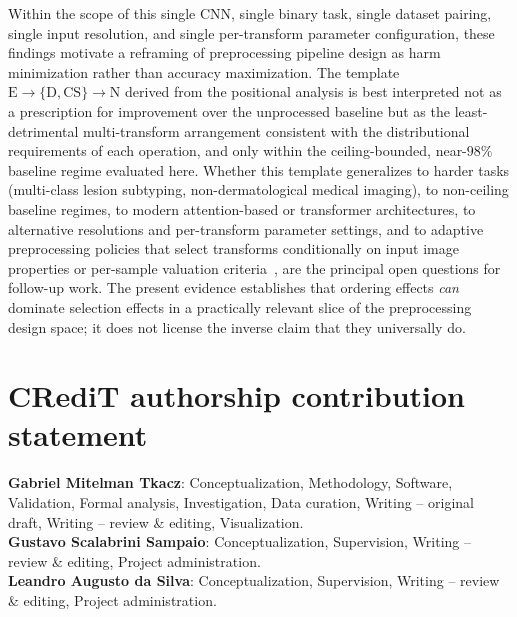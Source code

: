 \documentclass[preprint,5p,times,twocolumn]{elsarticle}
\begin{document}
Within the scope of this single CNN, single binary task, single dataset pairing, single input resolution, and single per-transform parameter configuration, these findings motivate a reframing of preprocessing pipeline design as harm minimization rather than accuracy maximization. The template $\text{E} \to \{\text{D}, \text{CS}\} \to \text{N}$ derived from the positional analysis is best interpreted not as a prescription for improvement over the unprocessed baseline but as the least-detrimental multi-transform arrangement consistent with the distributional requirements of each operation, and only within the ceiling-bounded, near-$98\%$ baseline regime evaluated here. Whether this template generalizes to harder tasks (multi-class lesion subtyping, non-dermatological medical imaging), to non-ceiling baseline regimes, to modern attention-based or transformer architectures, to alternative resolutions and per-transform parameter settings, and to adaptive preprocessing policies that select transforms conditionally on input image properties or per-sample valuation criteria~\cite{Yoon2020}, are the principal open questions for follow-up work. The present evidence establishes that ordering effects \emph{can} dominate selection effects in a practically relevant slice of the preprocessing design space; it does not license the inverse claim that they universally do.




\section*{CRediT authorship contribution statement}
\textbf{Gabriel Mitelman Tkacz}: Conceptualization, Methodology, Software, Validation, Formal analysis, Investigation, Data curation, Writing -- original draft, Writing -- review \& editing, Visualization. \\
\textbf{Gustavo Scalabrini Sampaio}: Conceptualization, Supervision, Writing -- review \& editing, Project administration. \\
\textbf{Leandro Augusto da Silva}: Conceptualization, Supervision, Writing -- review \& editing, Project administration.
\end{document}
